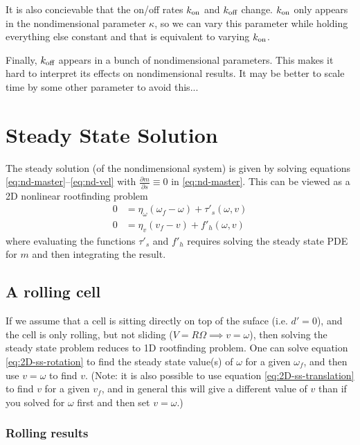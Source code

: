 \documentclass{article}
\newcommand{\Pder}[2]{\frac{\partial #1}{\partial #2}}
\newcommand{\tn}{\textnormal}
\begin{document}
It is also concievable that the on/off rates $k_\tn{on}$ and
$k_\tn{off}$ change. $k_\tn{on}$ only appears in the nondimensional
parameter $\kappa$, so we can vary this parameter while holding
everything else constant and that is equivalent to varying
$k_\tn{on}$. 

Finally, $k_\tn{off}$ appears in a bunch of nondimensional
parameters. This makes it hard to interpret its effects on
nondimensional results. It may be better to scale time by some other
parameter to avoid this...

\section{Steady State Solution}
\label{sec:steady-state-solut}

The steady solution (of the nondimensional system) is given by solving
equations \eqref{eq:nd-master}--\eqref{eq:nd-vel} with $\Pder{m}{s}
\equiv 0$ in \eqref{eq:nd-master}. This can be viewed as a 2D
nonlinear rootfinding problem
\begin{align}
  \label{eq:2D-ss-rotation}
  0 &= \eta_\omega (\omega_f - \omega) + \tau'_s(\omega, v)
  \\
  \label{eq:2D-ss-translation}
  0 &= \eta_v (v_f - v) + f'_h(\omega, v)
\end{align}
where evaluating the functions $\tau'_s$ and $f'_h$ requires solving
the steady state PDE for $m$ and then integrating the result.

\subsection{A rolling cell}
\label{sec:rolling-cell}

If we assume that a cell is sitting directly on top of the suface
(i.e. $d' = 0$), and the cell is only rolling, but not sliding ($V =
R\Omega \implies v = \omega$), then solving the steady state problem
reduces to 1D rootfinding problem. One can solve equation
\eqref{eq:2D-ss-rotation} to find the steady state value(s) of
$\omega$ for a given $\omega_f$, and then use $v = \omega$ to find
$v$. (Note: it is also possible to use equation
\eqref{eq:2D-ss-translation} to find $v$ for a given $v_f$, and in
general this will give a different value of $v$ than if you solved for
$\omega$ first and then set $v=\omega$.)

\subsubsection{Rolling results}
\label{sec:rolling-results}
\end{document}
